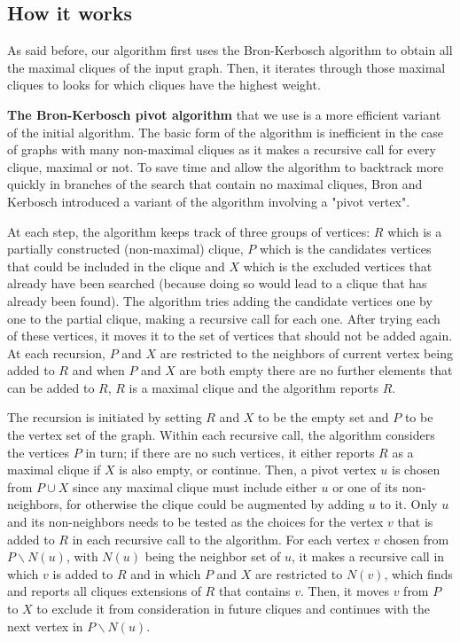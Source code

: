 \subsection{How it works}

As said before, our algorithm first uses the Bron-Kerbosch algorithm to obtain
all the maximal cliques of the input graph. Then, it iterates through those maximal
cliques to looks for which cliques have the highest weight. \bigskip

\textbf{The Bron-Kerbosch pivot algorithm} that we use is a more efficient variant
of the initial algorithm. The basic form of the algorithm is inefficient in the
case of graphs with many non-maximal cliques as it makes a recursive call for
every clique, maximal or not. To save time and allow the algorithm to backtrack
more quickly in branches of the search that contain no maximal cliques, Bron and
Kerbosch introduced a variant of the algorithm involving a "pivot vertex". \bigskip

At each step, the algorithm keeps track of three groups of vertices: $R$ which is
a partially constructed (non-maximal) clique, $P$ which is the candidates vertices
that could be included in the clique and $X$ which is the excluded vertices that
already have been searched (because doing so would lead to a clique that has
already been found). The algorithm tries adding the candidate vertices one by one
to the partial clique, making a recursive call for each one. After trying each of
these vertices, it moves it to the set of vertices that should not be added again.
At each recursion, $P$ and $X$ are restricted to the neighbors of current vertex
being added to $R$ and when $P$ and $X$ are both empty there are no further
elements that can be added to $R$, $R$ is a maximal clique and the algorithm
reports $R$. \bigskip

The recursion is initiated by setting $R$ and $X$ to be the empty set and $P$ to
be the vertex set of the graph. Within each recursive call, the algorithm considers
the vertices $P$ in turn; if there are no such vertices, it either reports $R$ as
a maximal clique if $X$ is also empty, or continue. Then, a pivot vertex $u$ is
chosen from $P\cup X$ since any maximal clique must include either $u$ or one of
its non-neighbors, for otherwise the clique could be augmented by adding $u$ to it.
Only $u$ and its non-neighbors needs to be tested as the choices for the vertex
$v$ that is added to $R$ in each recursive call to the algorithm. For each vertex
$v$ chosen from $P\backslash N(u)$, with $N(u)$ being the neighbor set of $u$,
it makes a recursive call in which $v$ is added to $R$ and in which $P$ and $X$
are restricted to $N(v)$, which finds and reports all cliques extensions of $R$
that contains $v$. Then, it moves $v$ from $P$ to $X$ to exclude it from consideration
in future cliques and continues with the next vertex in $P\backslash N(u)$. \bigskip

